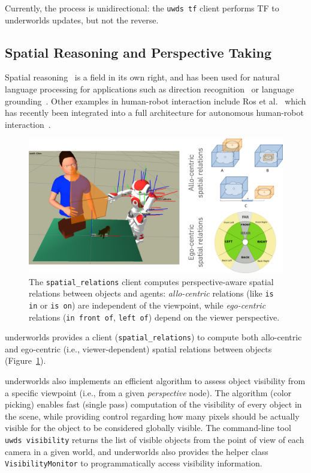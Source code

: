 \documentclass[conference]{IEEEtran}
\newcommand{\etal}{et al.\xspace}
\newcommand{\ie}{i.e.,\xspace}
\newcommand{\uwds}{{\sc underworlds}\xspace}
\begin{document}
Currently, the process is unidirectional: the {\tt uwds tf} client performs TF
to \uwds updates, but not the reverse.

\subsection{Spatial Reasoning and Perspective Taking}

Spatial reasoning~\cite{O'Keefe1999} is a field in its own right, and has been
used for natural language processing for applications such as direction
recognition~\cite{Kollar2010,Matuszek2010} or language
grounding~\cite{Tellex2010}. Other examples in human-robot interaction include Ros
\etal~\cite{ros2010solving, ros2010which} which has recently been integrated
into a full architecture for autonomous human-robot
interaction~\cite{lemaignan2016artificial}.

\begin{figure}
    \centering
    \includegraphics[width=\linewidth]{spatialrelations}
    \caption{The {\tt spatial\_relations} client computes perspective-aware
    spatial relations between objects and agents: \emph{allo-centric} relations (like
    {\tt is in} or {\tt is on}) are independent of the viewpoint, while
    \emph{ego-centric} relations ({\tt in front of}, {\tt left of}) depend on
    the viewer perspective.}
    \label{fig|spatialrelations}
\end{figure}

\uwds provides a client ({\tt spatial\_relations}) to compute both
allo-centric and ego-centric (\ie viewer-dependent) spatial relations
between objects (Figure~\ref{fig|spatialrelations}).


\uwds also implements an efficient algorithm to assess object visibility from a
specific viewpoint (\ie from a given \emph{perspective} node). The algorithm (color
picking) enables fast (single pass) computation of the visibility of every
object in the scene, while providing control regarding how many pixels should be actually
visible for the object to be considered globally visible. The
command-line tool {\tt uwds visibility} returns the list of visible objects from
the point of view of each camera in a given world, and \uwds also provides the
helper class {\tt VisibilityMonitor} to programmatically access visibility
information.
\end{document}

